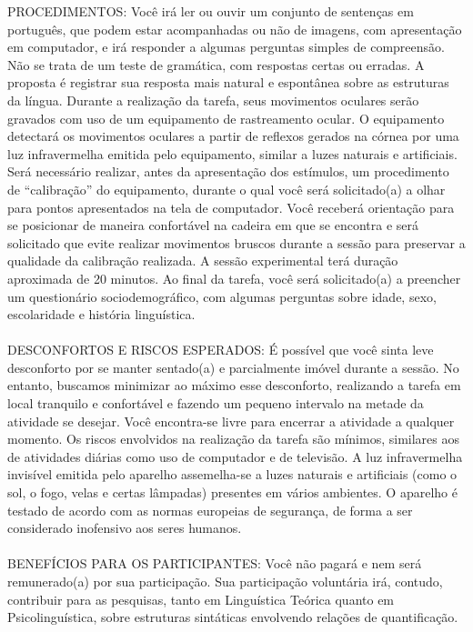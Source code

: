 PROCEDIMENTOS: Você irá ler ou ouvir um conjunto de sentenças em português, que podem estar acompanhadas ou não de imagens, com apresentação em computador, e irá responder a algumas perguntas simples de compreensão. Não se trata de um teste de gramática, com respostas certas ou erradas. A proposta é registrar sua resposta mais natural e espontânea sobre as estruturas da língua. Durante a realização da tarefa, seus movimentos oculares serão gravados com uso de um equipamento de rastreamento ocular. O equipamento detectará os movimentos oculares a partir de reflexos gerados na córnea por uma luz infravermelha emitida pelo equipamento, similar a luzes naturais e artificiais. Será necessário realizar, antes da apresentação dos estímulos, um procedimento de ``calibração'' do equipamento, durante o qual você será solicitado(a) a olhar para pontos apresentados na tela de computador. Você receberá orientação para se posicionar de maneira confortável na cadeira em que se encontra e será solicitado que evite realizar movimentos bruscos durante a sessão para preservar a qualidade da calibração realizada. A sessão experimental terá duração aproximada de 20 minutos. Ao final da tarefa, você será solicitado(a) a preencher um questionário sociodemográfico, com algumas perguntas sobre idade, sexo, escolaridade e história linguística.
\\
\\
DESCONFORTOS E RISCOS ESPERADOS: É possível que você sinta leve desconforto por se manter sentado(a) e parcialmente imóvel durante a sessão. No entanto, buscamos minimizar ao máximo esse desconforto, realizando a tarefa em local tranquilo e confortável e fazendo um pequeno intervalo na metade da atividade se desejar. Você encontra-se livre para encerrar a atividade a qualquer momento. Os riscos envolvidos na realização da tarefa são mínimos, similares aos de atividades diárias como uso de computador e de televisão. A luz infravermelha invisível emitida pelo aparelho assemelha-se a luzes naturais e artificiais (como o sol, o fogo, velas e certas lâmpadas) presentes em vários ambientes. O aparelho é testado de acordo com as normas europeias de segurança, de forma a ser considerado inofensivo aos seres humanos.
\\
\\
BENEFÍCIOS PARA OS PARTICIPANTES: Você não pagará e nem será remunerado(a) por sua participação. Sua participação voluntária irá, contudo, contribuir para as pesquisas, tanto em Linguística Teórica quanto em Psicolinguística, sobre estruturas sintáticas envolvendo relações de quantificação.
